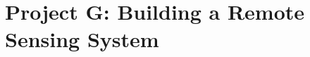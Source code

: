 \begin{comment}
\item The results so far probably look ``quite good'' by eye.  i.e. the signal shape plotted on top of the data probably looks like it fits quite well.  However this can be misleading when performing a precision measurement.  You should make a plot of what are called the ``residuals.'' A residual is the difference between the data in the binned histogram and the best-fit mass model value for the centre of that bin. Describe what you see.

\newpage

\item There are several ways to enhance the scope of the project.

\begin{itemize} 
\item For example, if the single
Gaussian mass model does not fit the data perfectly, one can try other mass models,
i.e. by using a signal PDF that goes beyond a single Gaussian
function. One example: is a PDF comprising a function which is the sum of two Gaussian functions (i.e. one
narrow and one wide Gaussian function to fit a single D meson
peak. Alternatively try a Crystal Ball function, which incorporates a non-Gaussian tail at the lower end of
the mass peak. The functional shape is described elsewhere, e.g. see:
\begin{verbatim}
https://en.wikipedia.org/wiki/Crystal_Ball_function 
\end{verbatim} 
You could implement each of these functions in your PDF and see how much better
they are at describing the data.
\item Try to extend the fit to include the kinematic reflection
\item Read the publication and see what is said about systematic errors. Make a reasonable
attempt at determining some systematic errors on the masses.
\item Compare your results to the PDG and previous measurements.
\item From the yields of $B_s$ and $B^0$ mesons, following the
  procedures in the papers try to evaluate the ratio of branching
  ratios of these modes.
\end{itemize}


\end{enumerate}

 
\end{comment}

\newpage
\section{Project G: Building a Remote Sensing System}

